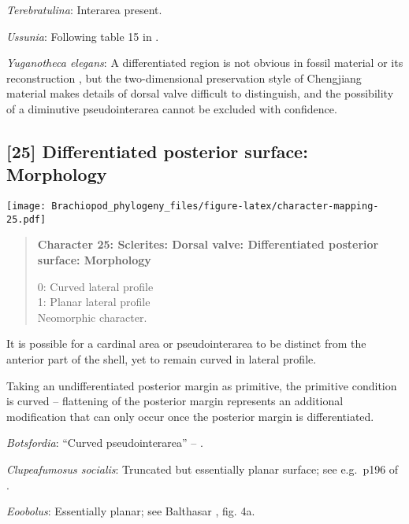 \documentclass[openany]{book}
\theoremstyle{definition}
\theoremstyle{definition}
\theoremstyle{definition}
\theoremstyle{remark}
\begin{document}
\hypertarget{Terebratulina-coding-24}{}
\emph{Terebratulina}: Interarea present.

\hypertarget{Ussunia-coding-24}{}
\emph{Ussunia}: Following table 15 in
\citet{Williams2000LinguliformeaCraniiformea}.

\hypertarget{Yuganotheca_elegans-coding-24}{}
\emph{Yuganotheca elegans}: A differentiated region is not obvious in
fossil material or its reconstruction \citep{Zhang2014Anearly}, but the
two-dimensional preservation style of Chengjiang material makes details
of dorsal valve difficult to distinguish, and the possibility of a
diminutive pseudointerarea cannot be excluded with confidence.

\subsection*{{[}25{]} Differentiated posterior surface:
Morphology}\label{differentiated-posterior-surface-morphology}

\texttt{[image: Brachiopod\_phylogeny\_files/figure-latex/character-mapping-25.pdf]}

\begin{quote}
\textbf{Character 25: Sclerites: Dorsal valve: Differentiated posterior
surface: Morphology}

0: Curved lateral profile\\
1: Planar lateral profile\\
Neomorphic character.
\end{quote}

It is possible for a cardinal area or pseudointerarea to be distinct
from the anterior part of the shell, yet to remain curved in lateral
profile.

Taking an undifferentiated posterior margin as primitive, the primitive
condition is curved -- flattening of the posterior margin represents an
additional modification that can only occur once the posterior margin is
differentiated.

\hypertarget{Botsfordia-coding-25}{}
\emph{Botsfordia}: ``Curved pseudointerarea'' --
\citet{Skovsted2017Depthrelated}.

\hypertarget{Clupeafumosus_socialis-coding-25}{}
\emph{Clupeafumosus socialis}: Truncated but essentially planar surface;
see e.g.~p196 of \citet{Topper2013Reappraisalof}.

\hypertarget{Eoobolus-coding-25}{}
\emph{Eoobolus}: Essentially planar; see Balthasar
\citeyearpar{Balthasar2009Thebrachiopod}, fig. 4a.
\end{document}
